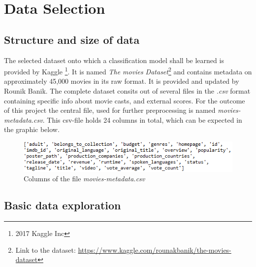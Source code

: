 \chapter{Data Selection}
\label{cha:data_selection}

\section{Structure and size of data}
The selected dataset onto which a classification model shall be learned is provided by Kaggle \footnote{2017 Kaggle Inc}. It is named \textit{The movies Dataset}\footnote{Link to the dataset: \hyperref[https://www.kaggle.com/rounakbanik/the-movies-dataset]{https://www.kaggle.com/rounakbanik/the-movies-dataset}} and contains metadata on approximately 45,000 movies in its raw format. It is provided and updated by Rounik Banik. The complete dataset consits out of several files in the \textit{.csv} format containing specific info about movie casts, and external scores. For the outcome of this project the central file, used for further preprocessing is named \textit{movies-metadata.csv}. This csv-file holds 24 columns in total, which can be expected in the graphic below.
\begin{figure}[ht]
	\centering
		\includegraphics[width=\textwidth]{images/Raw_dataset_headers.png}
	\caption{Columns of the file \textit{movies-metadata.csv}}
\end{figure}




\section{Basic data exploration}

